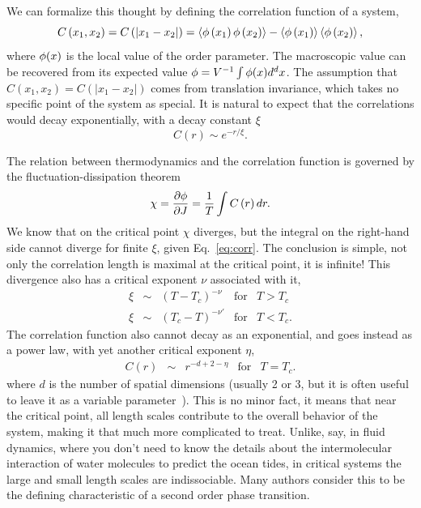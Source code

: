 We can formalize this thought by defining the correlation function of a system,
\begin{equation}
    \label{eq:corr}
    C\left(x_{1},x_{2}\right)=
    C\left(\left|x_{1}-x_{2}\right|\right)=
    \left\langle \phi\left(x_{1}\right)\phi\left(x_{2}\right)\right\rangle 
    -\left\langle \phi\left(x_{1}\right)\right\rangle
    \left\langle \phi\left(x_{2}\right)\right\rangle,
\end{equation}
where $\phi(x)$ is the local value of the order parameter. The macroscopic
value can be recovered from its expected value $\phi=V^{-1}\int\phi(x)d^d x$.
The assumption that
$C\left(x_{1},x_{2}\right)=C\left(\left|x_{1}-x_{2}\right|\right)$ comes from
translation invariance, which takes no specific point of the system as special.
It is natural to expect that the correlations would decay exponentially, with a
decay constant $\xi$
\begin{equation}
    \label{eq:corr}
    C\left(r\right)\sim e^{-r/\xi}.
\end{equation}

The relation between thermodynamics and the correlation function is governed
by the fluctuation-dissipation theorem
\begin{equation}
    \chi=\frac{\partial\phi}{\partial J}=\frac{1}{T}\int C\left(r\right)dr.
\end{equation}
We know that on the critical point $\chi$ diverges, but  the integral on the
right-hand side cannot diverge for finite $\xi$, given Eq.~\ref{eq:corr}.
The conclusion is simple, not only the correlation length is maximal at the
critical point, it is infinite! This divergence also has a critical exponent
$\nu$ associated with it,
\begin{equation}
    \label{eq:corlen}
    \begin{array}{ccccc}
        \xi & \sim & {\left(T-T_c\right)}^{-\nu}  & \mbox{for} & T > T_c \\
        \xi & \sim & {\left(T_c-T\right)}^{-\nu'} & \mbox{for} & T < T_c.
    \end{array}
\end{equation}
The correlation function also cannot decay as an exponential, and goes instead
as a power law, with yet another critical exponent $\eta$,
\begin{equation}
    \label{eq:critcor}
    \begin{array}{ccccc}
        C(r) & \sim & r^{-d+2-\eta} & \mbox{for} & T = T_c.
    \end{array}
\end{equation}
where $d$ is the number of spatial dimensions (usually 2 or 3, but it is often
useful to leave it as a variable parameter~\cite{Wilson1972}). This is no minor
fact, it means that near the critical point, all length scales contribute to
the overall behavior of the system, making it that much more complicated to
treat. Unlike, say, in fluid dynamics, where you don't need to know the details
about the intermolecular interaction of water molecules to predict the ocean
tides, in critical systems the large and small length scales are indissociable.
Many authors consider this to be the defining characteristic of a second order
phase transition.

